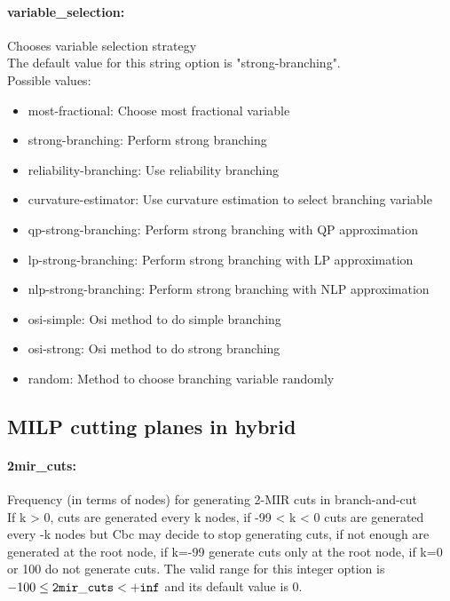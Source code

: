 \paragraph{variable\_selection:}\label{sec:variable_selection} Chooses variable selection strategy $\;$ \\

The default value for this string option is "strong-branching".
\\ 
Possible values:
\begin{itemize}
   \item most-fractional: Choose most fractional variable
   \item strong-branching: Perform strong branching
   \item reliability-branching: Use reliability branching
   \item curvature-estimator: Use curvature estimation to select branching
variable
   \item qp-strong-branching: Perform strong branching with QP approximation
   \item lp-strong-branching: Perform strong branching with LP approximation
   \item nlp-strong-branching: Perform strong branching with NLP approximation
   \item osi-simple: Osi method to do simple branching
   \item osi-strong: Osi method to do strong branching
   \item random: Method to choose branching variable randomly
\end{itemize}

\subsection{MILP cutting planes in hybrid}
\label{sec:MILP_cutting_planes_in_hybrid}
\paragraph{2mir\_cuts:}\label{sec:2mir_cuts} Frequency (in terms of nodes) for generating 2-MIR cuts in branch-and-cut $\;$ \\
 If k > 0, cuts are generated every k nodes, if
-99 < k < 0 cuts are generated every -k nodes but
Cbc may decide to stop generating cuts, if not
enough are generated at the root node, if k=-99
generate cuts only at the root node, if k=0 or
100 do not generate cuts. The valid range for this integer option is
$-100 \le {\tt 2mir\_cuts } <  {\tt +inf}$
and its default value is $0$.


